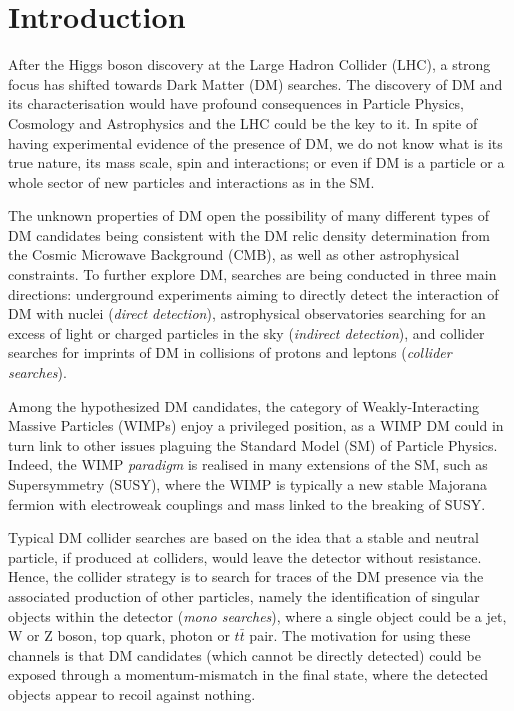 \documentclass[prd,aps,letterpaper,floatfix,superscriptaddress,preprintnumbers,twocolumn,10pt,nofootinbib]{revtex4-1}
\begin{document}
\section{Introduction}
After the Higgs boson discovery at the Large Hadron Collider (LHC), a strong focus has shifted towards Dark Matter (DM) searches. The discovery of DM and its characterisation would have profound consequences in Particle Physics, Cosmology and Astrophysics and the LHC could be the key to it. In spite of having experimental evidence of the presence of DM, we do not know what is its true nature, its mass scale, spin and interactions; or even if DM is a particle or a whole sector of new particles and interactions as in the SM. 

The unknown properties of DM open the possibility of many different types of DM candidates being consistent with the DM relic density determination from the Cosmic Microwave Background (CMB), as well as other astrophysical constraints. To further explore DM, searches are being conducted  in three main directions: underground experiments aiming to directly detect the interaction of DM with nuclei ({\it direct detection}), astrophysical observatories searching for an excess of light or charged particles in the sky ({\it indirect detection}), and collider searches for imprints of DM in collisions of protons and leptons ({\it collider searches}).  

Among the hypothesized DM candidates, the category of Weakly-Interacting Massive Particles (WIMPs) enjoy a privileged position, as a WIMP DM could in turn link to other issues plaguing the Standard Model (SM) of Particle Physics. Indeed, the WIMP {\it paradigm} is realised in many extensions of the SM, such as Supersymmetry (SUSY), where the WIMP is typically a new stable Majorana fermion with electroweak couplings and mass linked to the breaking of SUSY.

Typical DM collider searches are based on the idea that a stable and neutral particle, if produced at colliders, would leave the detector without resistance. Hence, the collider strategy is to search for traces of the DM presence via the associated production of other particles, namely the identification of singular objects within the detector ({\it mono searches}), where a single object could be a jet, W or Z boson, top quark, photon or $ t \bar t $ pair. The motivation for using these channels is that DM candidates (which cannot be directly detected) could be exposed through a momentum-mismatch in the final state, where the detected objects appear to recoil against nothing. %
\end{document}
